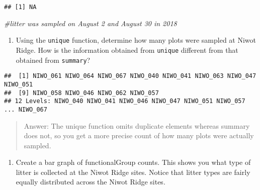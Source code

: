 \documentclass[]{article}
\newenvironment{Shaded}{\begin{snugshade}}{\end{snugshade}}
\newcommand{\CommentTok}[1]{\textcolor[rgb]{0.56,0.35,0.01}{\textit{#1}}}
\newcommand{\KeywordTok}[1]{\textcolor[rgb]{0.13,0.29,0.53}{\textbf{#1}}}
\newcommand{\NormalTok}[1]{#1}
\newcommand{\OperatorTok}[1]{\textcolor[rgb]{0.81,0.36,0.00}{\textbf{#1}}}
\providecommand{\tightlist}{%
  \setlength{\itemsep}{0pt}\setlength{\parskip}{0pt}}
\begin{document}
\begin{Shaded}
\end{Shaded}

\begin{verbatim}
## [1] NA
\end{verbatim}

\begin{Shaded}
\begin{Highlighting}[]
\CommentTok{#litter was sampled on August 2 and August 30 in 2018}
\end{Highlighting}
\end{Shaded}

\begin{enumerate}
\def\labelenumi{\arabic{enumi}.}
\setcounter{enumi}{12}
\tightlist
\item
  Using the \texttt{unique} function, determine how many plots were
  sampled at Niwot Ridge. How is the information obtained from
  \texttt{unique} different from that obtained from \texttt{summary}?
\end{enumerate}

\begin{Shaded}
\end{Shaded}

\begin{verbatim}
##  [1] NIWO_061 NIWO_064 NIWO_067 NIWO_040 NIWO_041 NIWO_063 NIWO_047 NIWO_051
##  [9] NIWO_058 NIWO_046 NIWO_062 NIWO_057
## 12 Levels: NIWO_040 NIWO_041 NIWO_046 NIWO_047 NIWO_051 NIWO_057 ... NIWO_067
\end{verbatim}

\begin{quote}
Answer: The unique function omits duplicate elements whereas summary
does not, so you get a more precise count of how many plots were
actually sampled.
\end{quote}

\begin{enumerate}
\def\labelenumi{\arabic{enumi}.}
\setcounter{enumi}{13}
\tightlist
\item
  Create a bar graph of functionalGroup counts. This shows you what type
  of litter is collected at the Niwot Ridge sites. Notice that litter
  types are fairly equally distributed across the Niwot Ridge sites.
\end{enumerate}
\end{document}
